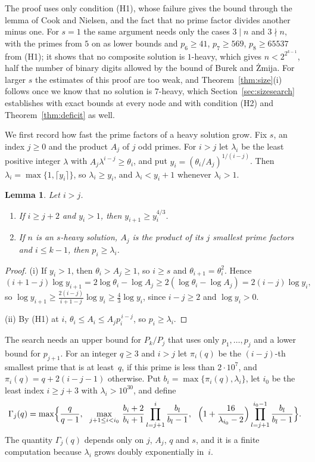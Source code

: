 \documentclass[11pt,reqno]{amsart}
\numberwithin{equation}{section}
\theoremstyle{plain}
\newtheorem{lemma}[theorem]{Lemma}
\theoremstyle{definition}
\theoremstyle{remark}
\begin{document}
The proof uses only condition (H1), whose failure gives the bound
through the lemma of Cook and Nielsen, and the fact that no prime
factor divides another minus one.
For $s=1$ the same argument needs only the cases $3\mid n$ and
$3\nmid n$, with the primes from $5$ on as lower bounds and
$p_6\ge41$, $p_7\ge569$, $p_8\ge65537$ from (H1); it shows that no
composite solution is $1$-heavy, which gives $n<2^{2^{k-1}}$, half the
number of binary digits allowed by the bound of Burek and \.Zmija. For larger $s$ the estimates of this proof
are too weak, and Theorem~\ref{thm:size}(i) follows once we know that
no solution is $7$-heavy, which Section~\ref{sec:sizesearch}
establishes with exact bounds at every node and with condition (H2)
and Theorem~\ref{thm:deficit} as well.

We first record how fast the prime factors of a heavy solution grow.
Fix $s$, an index $j\ge0$ and the product $A_j$ of $j$ odd primes. For
$i>j$ let $\lambda_i$ be the least positive integer $\lambda$ with
$A_j\lambda^{i-j}\ge\theta_i$, and put $y_i=(\theta_i/A_j)^{1/(i-j)}$.
Then $\lambda_i=\max\{1,\lceil y_i\rceil\}$, so $\lambda_i\ge y_i$,
and $\lambda_i<y_i+1$ whenever $\lambda_i>1$.

\begin{lemma}\label{lem:growth}
Let $i>j$.
\begin{enumerate}[label=\textup{(\roman*)}]
\item If $i\ge j+2$ and $y_i>1$, then $y_{i+1}\ge y_i^{4/3}$.
\item If $n$ is an $s$-heavy solution, $A_j$ is the product of its $j$
smallest prime factors and $i\le k-1$, then $p_i\ge\lambda_i$.
\end{enumerate}
\end{lemma}

\begin{proof}
(i) If $y_i>1$, then $\theta_i>A_j\ge1$, so $i\ge s$ and
$\theta_{i+1}=\theta_i^2$. Hence
\[
  (i+1-j)\log y_{i+1}=2\log\theta_i-\log A_j
  \ge2(\log\theta_i-\log A_j)=2(i-j)\log y_i ,
\]
so $\log y_{i+1}\ge\frac{2(i-j)}{i+1-j}\log y_i\ge\frac43\log y_i$,
since $i-j\ge2$ and $\log y_i>0$.

(ii) By (H1) at $i$, $\theta_i\le A_i\le A_jp_i^{\,i-j}$, so
$p_i\ge\lambda_i$.
\end{proof}

The search needs an upper bound for $P_k/P_j$ that uses only
$p_1,\dots,p_j$ and a lower bound for $p_{j+1}$. For an integer
$q\ge3$ and $i>j$ let $\pi_i(q)$ be the $(i-j)$-th smallest prime that
is at least~$q$, if this prime is less than $2\cdot10^7$, and
$\pi_i(q)=q+2(i-j-1)$ otherwise. Put
$b_i=\max\{\pi_i(q),\lambda_i\}$, let $i_0$ be the least index
$i\ge j+3$ with $\lambda_i>10^{30}$, and define
\begin{equation}\label{eq:Gamma}
  \Gamma_j(q)=\max\Bigl\{\frac{q}{q-1},\ \
  \max_{j+1\le i<i_0}\,\frac{b_i+2}{b_i+1}\prod_{l=j+1}^{i}
  \frac{b_l}{b_l-1},\ \
  \Bigl(1+\frac{16}{\lambda_{i_0}-2}\Bigr)\prod_{l=j+1}^{i_0-1}
  \frac{b_l}{b_l-1}\Bigr\}.
\end{equation}
The quantity $\Gamma_j(q)$ depends only on $j$, $A_j$, $q$ and $s$,
and it is a finite computation because $\lambda_i$ grows doubly
exponentially in~$i$.
\end{document}

